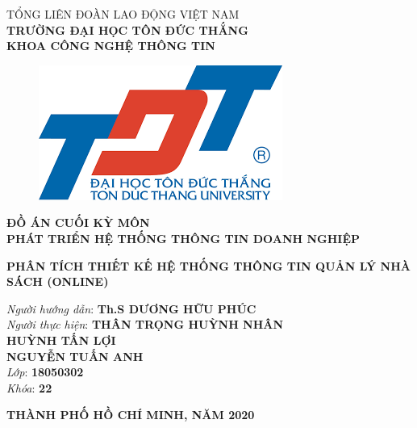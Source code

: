 \documentclass{report}
\begin{document}

\begin{center}
	\fontsize{14}{20}\selectfont
	\textsc{TỔNG LIÊN ĐOÀN LAO ĐỘNG VIỆT NAM\\ 
		\textbf{TRƯỜNG ĐẠI HỌC TÔN ĐỨC THẮNG\\} 
		\textbf{KHOA CÔNG NGHỆ THÔNG TIN}}
	
	\vspace{0.08cm}
	\begin{figure}[htp]
		\begin{center}
			\includegraphics[scale=0.5]{image/logo tdt.png}
		\end{center}
	\end{figure}
	
	\fontsize{15}{20}\selectfont\textbf{ĐỒ ÁN CUỐI KỲ MÔN\\ PHÁT TRIỂN HỆ THỐNG THÔNG TIN DOANH NGHIỆP\\}
	
	\vspace{1.1cm}
	\fontsize{24}{20}\selectfont\textbf{PHÂN TÍCH THIẾT KẾ HỆ THỐNG THÔNG TIN QUẢN LÝ NHÀ SÁCH (ONLINE)}
\end{center}
\vspace{0.5cm}

\begin{flushright}
	\fontsize{14}{20}\selectfont
	\textit{Người hướng dẫn}: \textbf{Th.S DƯƠNG HỮU PHÚC}\\
	\textit{Người thực hiện}:
	\textbf{THÂN TRỌNG HUỲNH NHÂN}\\
	\textbf{HUỲNH TẤN LỢI}\\
	\textbf{NGUYỄN TUẤN ANH}\\
	\textit{Lớp}: \textbf{18050302}\\
	\textit{Khóa}: \textbf{22}\\
\end{flushright}
\vspace{1cm}
\begin{center}
	\fontsize{14}{20}\selectfont
	\textbf{THÀNH PHỐ HỒ CHÍ MINH, NĂM 2020}
\end{center}
\pagebreak
\end{document}
